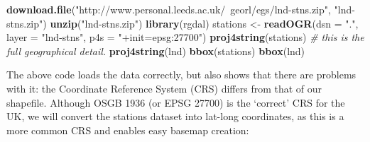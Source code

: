 \documentclass[]{article}
\newenvironment{Shaded}{}{}
\newcommand{\KeywordTok}[1]{\textcolor[rgb]{0.00,0.44,0.13}{\textbf{{#1}}}}
\newcommand{\DataTypeTok}[1]{\textcolor[rgb]{0.56,0.13,0.00}{{#1}}}
\newcommand{\StringTok}[1]{\textcolor[rgb]{0.25,0.44,0.63}{{#1}}}
\newcommand{\CommentTok}[1]{\textcolor[rgb]{0.38,0.63,0.69}{\textit{{#1}}}}
\newcommand{\NormalTok}[1]{{#1}}
\begin{document}
\begin{Shaded}
\begin{Highlighting}[]
\KeywordTok{download.file}\NormalTok{(}\StringTok{"http://www.personal.leeds.ac.uk/~georl/egs/lnd-stns.zip"}\NormalTok{, }\StringTok{"lnd-stns.zip"}\NormalTok{)}
\KeywordTok{unzip}\NormalTok{(}\StringTok{"lnd-stns.zip"}\NormalTok{)}
\KeywordTok{library}\NormalTok{(rgdal)}
\NormalTok{stations <- }\KeywordTok{readOGR}\NormalTok{(}\DataTypeTok{dsn =} \StringTok{"."}\NormalTok{, }\DataTypeTok{layer =} \StringTok{"lnd-stns"}\NormalTok{, }\DataTypeTok{p4s =} \StringTok{"+init=epsg:27700"}\NormalTok{)}
\KeywordTok{proj4string}\NormalTok{(stations)  }\CommentTok{# this is the full geographical detail.}
\KeywordTok{proj4string}\NormalTok{(lnd)}
\KeywordTok{bbox}\NormalTok{(stations)}
\KeywordTok{bbox}\NormalTok{(lnd)}
\end{Highlighting}
\end{Shaded}
The above code loads the data correctly, but also shows that there are
problems with it: the Coordinate Reference System (CRS) differs from
that of our shapefile. Although OSGB 1936 (or EPSG 27700) is the
`correct' CRS for the UK, we will convert the stations dataset into
lat-long coordinates, as this is a more common CRS and enables easy
basemap creation:
\end{document}
